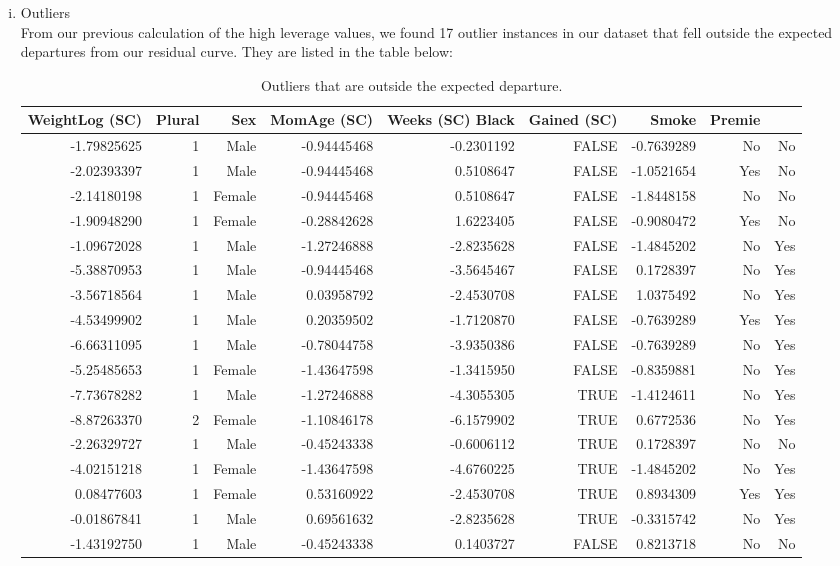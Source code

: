 \documentclass{article}\usepackage[]{graphicx}\usepackage[]{xcolor}
\begin{document}
\begin{enumerate}[a.]
\begin{enumerate}[i.]
\item Outliers\\

From our previous calculation of the high leverage values, we found 17 outlier instances in our dataset that fell outside the expected departures from our residual curve. They are listed in the table below:

\begin{table}[H]
\centering
\begin{tabular}{rrrrrrrrr}
  \hline
   WeightLog (SC) & Plural & Sex & MomAge (SC) & Weeks (SC) Black & Gained (SC) & Smoke & Premie \\ 
  \hline
  -1.79825625 & 1 & Male & -0.94445468 & -0.2301192 & FALSE & -0.7639289 & No & No\\
  -2.02393397 & 1 &  Male & -0.94445468 & 0.5108647 & FALSE & -1.0521654 & Yes &  No \\
  -2.14180198 & 1 & Female & -0.94445468 & 0.5108647 & FALSE & -1.8448158 & No & No \\
  -1.90948290 & 1 & Female & -0.28842628  & 1.6223405 & FALSE & -0.9080472 & Yes & No \\ 
  -1.09672028 & 1 &  Male & -1.27246888 & -2.8235628 &  FALSE & -1.4845202 & No & Yes\\
  -5.38870953 & 1 & Male & -0.94445468 & -3.5645467 & FALSE  & 0.1728397 & No & Yes\\
  -3.56718564 & 1 &  Male & 0.03958792 & -2.4530708 & FALSE & 1.0375492 & No & Yes\\
  -4.53499902 & 1 & Male & 0.20359502 & -1.7120870 & FALSE & -0.7639289 & Yes & Yes\\
  -6.66311095 & 1 & Male & -0.78044758 & -3.9350386 & FALSE & -0.7639289 & No & Yes\\
  -5.25485653 & 1 & Female & -1.43647598 & -1.3415950 & FALSE & -0.8359881 & No & Yes\\
  -7.73678282 & 1 & Male & -1.27246888 &-4.3055305 & TRUE & -1.4124611  & No & Yes\\
  -8.87263370 & 2 & Female & -1.10846178 & -6.1579902 & TRUE & 0.6772536 & No & Yes\\
  -2.26329727 & 1 & Male & -0.45243338 & -0.6006112 & TRUE & 0.1728397 & No & No\\
  -4.02151218 & 1 & Female & -1.43647598 & -4.6760225 & TRUE & -1.4845202 & No & Yes\\
   0.08477603 & 1 & Female & 0.53160922 & -2.4530708 & TRUE & 0.8934309 & Yes & Yes\\
  -0.01867841 & 1 & Male & 0.69561632 & -2.8235628 & TRUE & -0.3315742 & No & Yes\\
  -1.43192750 & 1 & Male & -0.45243338 & 0.1403727 & FALSE & 0.8213718 & No & No\\
   \hline
\end{tabular}
\label{}
\caption{Outliers that are outside the expected departure.}
\end{table}



\end{enumerate}
\end{enumerate}
\end{document}
